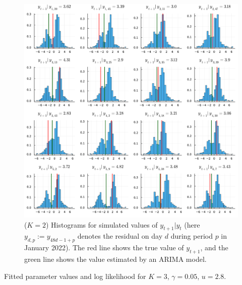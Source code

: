 \documentclass[11pt,twoside,openany]{book}
\numberwithin{Theorem}{chapter}
\numberwithin{Definition}{chapter}
\numberwithin{Lemma}{chapter}
\numberwithin{Algorithm}{chapter}
\numberwithin{equation}{chapter}
\begin{document}
\begin{figure}[htp]
  \centering
  \includegraphics[scale=0.5]{../elexon/figures/ytp1_giv_yt_jan_22_k2_full_pred_final.pdf}
  \caption{($K=2$) Histograms for simulated values of $y_{t+1}|y_{t}$ (here $y_{d,p}:=y_{48d - 1 + p}$ denotes the residual on day $d$ during period $p$ in January
    2022).
The red line shows the true value of $y_{t+1}$, and the green line shows the
value estimated by an ARIMA model.}\label{fig:jan22_hists_22}
\end{figure}

\FloatBarrier

\begin{table}[htbp] \centering
  
  \caption{Fitted parameter values and log likelihood for $K=3$, $\gamma = 0.05$, $u=2.8$.\label{table:k_3_fits}}
\end{table}
\end{document}
